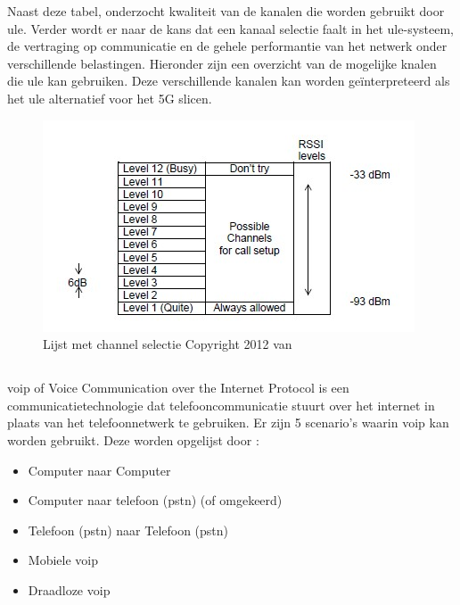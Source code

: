 Naast deze tabel, onderzocht \textcite{Das2012} kwaliteit van de kanalen die worden gebruikt door \gls{ule}. Verder wordt er naar de kans dat een kanaal selectie faalt in het \gls{ule}-systeem, de vertraging op communicatie en de gehele performantie van het netwerk onder verschillende belastingen. Hieronder zijn een overzicht van de mogelijke knalen die \gls{ule} kan gebruiken. Deze verschillende kanalen kan worden geïnterpreteerd als het \gls{ule} alternatief voor het 5G slicen.

\begin{figure}[H]
  \includegraphics[width=\linewidth]{../graphics/ULE-channels.jpg}
  \caption{Lijst met channel selectie \autocite[Door][]{Das2012} Copyright 2012 van \textcite{Das2012}}
  \label{fig:ule-channels}
\end{figure}

\subsection{}%
\label{sec:voip}%

\gls{voip} of Voice Communication over the Internet Protocol is een communicatietechnologie dat telefooncommunicatie stuurt over het internet in plaats van het telefoonnetwerk te gebruiken. \Autocite{Soenmez2018} Er zijn 5 scenario's waarin \gls{voip} kan worden gebruikt. Deze worden opgelijst door \textcite{Soenmez2018}:

\begin{itemize}
  \item Computer naar Computer
  \item Computer naar telefoon (\gls{pstn}) (of omgekeerd)
  \item Telefoon (\gls{pstn}) naar Telefoon (\gls{pstn})
  \item Mobiele \gls{voip}
  \item Draadloze \gls{voip}
\end{itemize}

